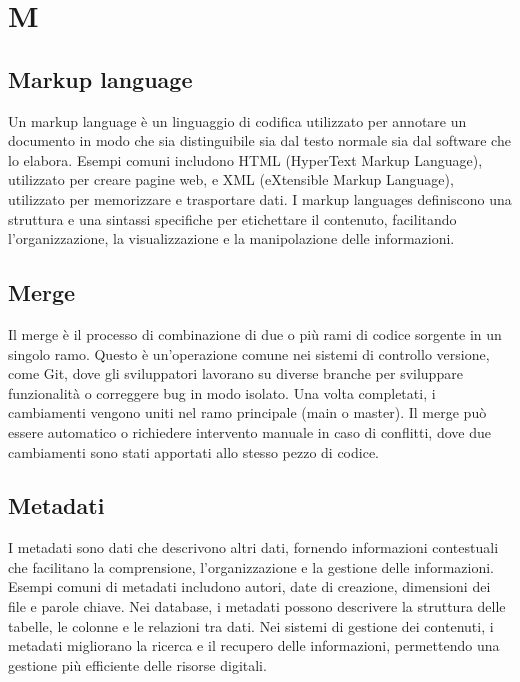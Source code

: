 \section{M}
\vspace{2em}
\subsection*{Markup language}
\par Un markup language è un linguaggio di codifica utilizzato per annotare un documento in modo che sia distinguibile sia dal testo normale sia dal software che lo elabora. Esempi comuni includono HTML (HyperText Markup Language), utilizzato per creare pagine web, e XML (eXtensible Markup Language), utilizzato per memorizzare e trasportare dati. I markup languages definiscono una struttura e una sintassi specifiche per etichettare il contenuto, facilitando l'organizzazione, la visualizzazione e la manipolazione delle informazioni.

\vspace{2em}
\subsection*{Merge}
\par Il merge è il processo di combinazione di due o più rami di codice sorgente in un singolo ramo. Questo è un'operazione comune nei sistemi di controllo versione, come Git, dove gli sviluppatori lavorano su diverse branche per sviluppare funzionalità o correggere bug in modo isolato. Una volta completati, i cambiamenti vengono uniti nel ramo principale (main o master). Il merge può essere automatico o richiedere intervento manuale in caso di conflitti, dove due cambiamenti sono stati apportati allo stesso pezzo di codice.

\vspace{2em}
\subsection*{Metadati}
\par I metadati sono dati che descrivono altri dati, fornendo informazioni contestuali che facilitano la comprensione, l'organizzazione e la gestione delle informazioni. Esempi comuni di metadati includono autori, date di creazione, dimensioni dei file e parole chiave. Nei database, i metadati possono descrivere la struttura delle tabelle, le colonne e le relazioni tra dati. Nei sistemi di gestione dei contenuti, i metadati migliorano la ricerca e il recupero delle informazioni, permettendo una gestione più efficiente delle risorse digitali.

